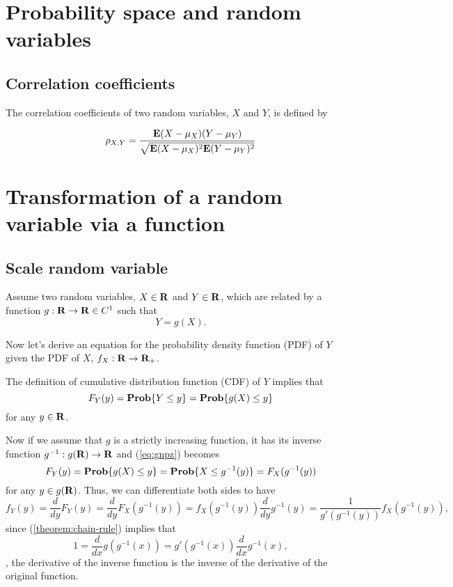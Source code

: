 
\section{Probability space and random variables}
\subsection{Correlation coefficients}

The correlation coefficients of two random variables, $X$ and $Y$, is defined by

\begin{equation}
\rho_{X,Y} = \frac{{\bf E{}} (X-\mu_X)(Y-\mu_Y)} {\sqrt{{\bf E{}} (X-\mu_X)^2 {\bf E{}}(Y-\mu_Y)^2}}
\end{equation}


\section{Transformation of a random variable via a function}

\subsection{Scale random variable}

Assume two random variables, $X\in\mathbf{R}$ and $Y\in\mathbf{R}$, which are related by
a function $g:\mathbf{R} \to \mathbf{R} \in C^{1}$
such that
\begin{equation}
\label{eq:g8cx}
Y = g(X).
\end{equation}

Now let's derive an equation for the probability density function (PDF) of $Y$
given the PDF of $X$, $f_X:\mathbf{R}\to{\mathbf{R}_+}$.

The definition of cumulative distribution function (CDF) of $Y$ implies that
\begin{equation}
\label{eq:gnpz}
    F_Y(y) = \mathop{\bf Prob}\{Y \leq y\} = \mathop{\bf Prob}\{g(X) \leq y\}
\end{equation}
for any $y\in\mathbf{R}$.

Now if we assume that $g$ is a strictly increasing function, it has its inverse function $g^{-1}: g(\mathbf{R}) \to \mathbf{R}$
and
(\ref{eq:gnpz}) becomes
\[
    F_Y(y) = \mathop{\bf Prob}\{g(X) \leq y\}
    = \mathop{\bf Prob}\{X \leq g^{-1}(y)\}
    = F_X(g^{-1}(y))
\]
for any $y\in g(\mathbf{R})$.
Thus, we can differentiate both sides to have
\begin{equation}
\label{eq:gnpz-1}
    f_Y(y) = \frac{d}{dy} F_Y(y)
    = \frac{d}{dy} F_X(g^{-1}(y))
    = f_X(g^{-1}(y)) \frac{d}{dy} g^{-1}(y)
    = \frac{1}{g'(g^{-1}(y))} f_X(g^{-1}(y)),
\end{equation}
since (\ref{theorem:chain-rule}) implies that
\begin{equation}
1
= \frac{d}{dx} g(g^{-1}(x))
= g'(g^{-1}(x)) \frac{d}{dx} g^{-1}(x),
\end{equation}
\ie, the derivative of the inverse function
is the inverse of the derivative of the original function.


